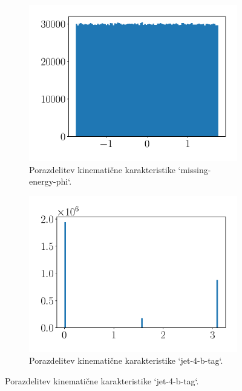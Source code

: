 \documentclass{article}
\begin{document}
\begin{figure}[H]
\centering
\begin{subfigure}{0.4\textwidth}
    \includegraphics[width=\linewidth]{images/missing-energy-phi.pdf}
	\caption{Porazdelitev kinemati\v{c}ne karakteristike `missing-energy-phi`.}
\end{subfigure}
\begin{subfigure}{0.4\textwidth}
    \includegraphics[width=\linewidth]{images/jet_4-b-tag.pdf}
	\caption{Porazdelitev kinemati\v{c}ne karakteristike `jet-4-b-tag`.}
\end{subfigure}


\end{figure}
\end{document}

